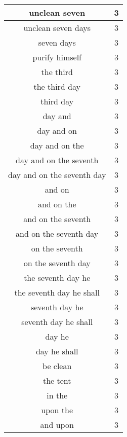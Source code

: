 \begin{center}
\begin{longtable}{|c|c|}
unclean seven & 3\\ \hline 
unclean seven days & 3\\ \hline 
seven days & 3\\ \hline 
purify himself & 3\\ \hline 
the third & 3\\ \hline 
the third day & 3\\ \hline 
third day & 3\\ \hline 
day and & 3\\ \hline 
day and on & 3\\ \hline 
day and on the & 3\\ \hline 
day and on the seventh & 3\\ \hline 
day and on the seventh day & 3\\ \hline 
and on & 3\\ \hline 
and on the & 3\\ \hline 
and on the seventh & 3\\ \hline 
and on the seventh day & 3\\ \hline 
on the seventh & 3\\ \hline 
on the seventh day & 3\\ \hline 
the seventh day he & 3\\ \hline 
the seventh day he shall & 3\\ \hline 
seventh day he & 3\\ \hline 
seventh day he shall & 3\\ \hline 
day he & 3\\ \hline 
day he shall & 3\\ \hline 
be clean & 3\\ \hline 
the tent & 3\\ \hline 
in the & 3\\ \hline 
upon the & 3\\ \hline 
and upon & 3\\ \hline 
\end{longtable}
\end{center}





